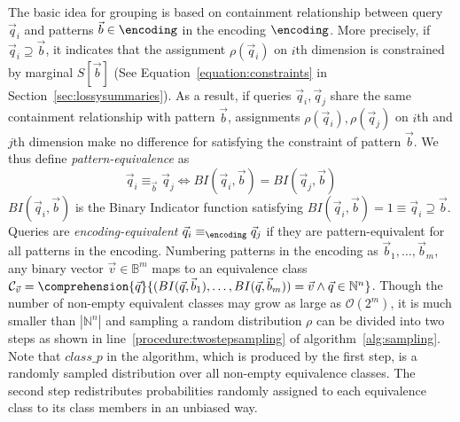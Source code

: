 The basic idea for grouping is based on containment relationship between query $\vec q_i$ and patterns $\vec{b}\in \encoding$ in the encoding $\encoding$. 
More precisely, if $\vec{q}_i\supseteq\vec{b}$, it indicates that the assignment $\rho(\vec{q}_i)$ on $i$th dimension is constrained by marginal $S[\vec{b}]$ (See Equation~\ref{equation:constraints} in Section~\ref{sec:lossysummaries}).
As a result, if queries $\vec{q}_i,\vec{q}_j$ share the same containment relationship with pattern $\vec{b}$, assignments $\rho(\vec{q}_i),\rho(\vec{q}_j)$ on $i$th and $j$th dimension make no difference for satisfying the constraint of pattern $\vec{b}$.
We thus define \textit{pattern-equivalence} as $$\vec{q}_i\equiv_{\vec{b}}\vec{q}_j\Leftrightarrow BI(\vec{q}_i,\vec{b})=BI(\vec{q}_j,\vec{b})$$ 
$BI(\vec{q}_i,\vec{b})$ is the Binary Indicator function satisfying $BI(\vec{q}_i,\vec{b})=1\equiv\vec{q}_i\supseteq\vec{b}$. 
Queries are \textit{encoding-equivalent} $\vec{q}_i\equiv_{\encoding}\vec{q}_j$ if they are pattern-equivalent for all patterns in the encoding. 
Numbering patterns in the encoding as $\vec{b}_1,\ldots,\vec{b}_m$, any binary vector $\vec{v}\in\mathbb{B}^m$ maps to an equivalence class $\mathcal{C}_{\vec{v}}=\comprehension{\vec{q}}{(BI(\vec{q},\vec{b}_1),\ldots,BI(\vec{q},\vec{b}_m))=\vec{v}\wedge\vec{q}\in\mathbb{N}^n}$.
Though the number of non-empty equivalent classes may grow as large as $\mathcal{O}(2^m)$, it is much smaller than $|\mathbb{N}^n|$ and sampling a random distribution $\rho$ can be divided into two steps as shown in line~\ref{procedure:twostepsampling} of algorithm~\ref{alg:sampling}. 
Note that $class\_p$ in the algorithm, which is produced by the first step, is a randomly sampled distribution over all non-empty equivalence classes. The second step redistributes probabilities randomly assigned to each equivalence class to its class members in an unbiased way.

